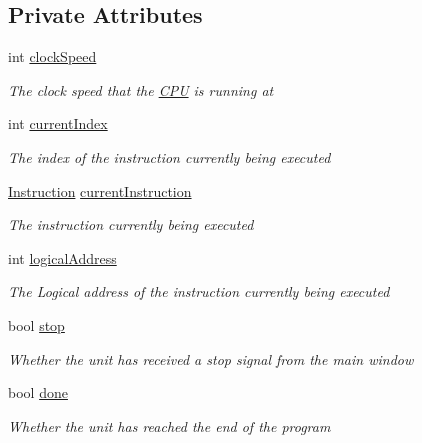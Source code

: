 \subsection*{Private Attributes}
\begin{DoxyCompactItemize}
\item 
int \hyperlink{class_c_p_u___o_s___simulator_1_1_c_p_u_1_1_execution_unit_a0deb0a3e0c9fa402598bbf18be6535cc}{clock\+Speed}
\begin{DoxyCompactList}\small\item\em The clock speed that the \hyperlink{namespace_c_p_u___o_s___simulator_1_1_c_p_u}{C\+P\+U} is running at \end{DoxyCompactList}\item 
int \hyperlink{class_c_p_u___o_s___simulator_1_1_c_p_u_1_1_execution_unit_af6807cb5343acc2c40a08166c748f1f0}{current\+Index}
\begin{DoxyCompactList}\small\item\em The index of the instruction currently being executed \end{DoxyCompactList}\item 
\hyperlink{class_c_p_u___o_s___simulator_1_1_c_p_u_1_1_instruction}{Instruction} \hyperlink{class_c_p_u___o_s___simulator_1_1_c_p_u_1_1_execution_unit_a12fc8d1fd19eab177941b9f98675eb7f}{current\+Instruction}
\begin{DoxyCompactList}\small\item\em The instruction currently being executed \end{DoxyCompactList}\item 
int \hyperlink{class_c_p_u___o_s___simulator_1_1_c_p_u_1_1_execution_unit_aa387f2bbbf0de1c75cbd1c79e27a630c}{logical\+Address}
\begin{DoxyCompactList}\small\item\em The Logical address of the instruction currently being executed \end{DoxyCompactList}\item 
bool \hyperlink{class_c_p_u___o_s___simulator_1_1_c_p_u_1_1_execution_unit_aad508435c1085ec880b75723260b0439}{stop}
\begin{DoxyCompactList}\small\item\em Whether the unit has received a stop signal from the main window \end{DoxyCompactList}\item 
bool \hyperlink{class_c_p_u___o_s___simulator_1_1_c_p_u_1_1_execution_unit_aa62cb66691fd4d782a4fa5c70843da6e}{done}
\begin{DoxyCompactList}\small\item\em Whether the unit has reached the end of the program \end{DoxyCompactList}\end{DoxyCompactItemize}


